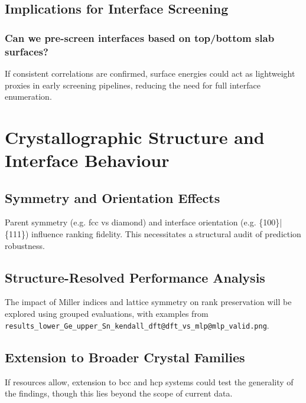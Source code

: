 
\subsection{Implications for Interface Screening}

\subsubsection{Can we pre-screen interfaces based on top/bottom slab surfaces?}

If consistent correlations are confirmed, surface energies could act as lightweight proxies in early screening pipelines, reducing the need for full interface enumeration.

\section{Crystallographic Structure and Interface Behaviour}

\subsection{Symmetry and Orientation Effects}

Parent symmetry (e.g. fcc vs diamond) and interface orientation (e.g. \{100\}|\{111\}) influence ranking fidelity. This necessitates a structural audit of prediction robustness.

\subsection{Structure-Resolved Performance Analysis}

The impact of Miller indices and lattice symmetry on rank preservation will be explored using grouped evaluations, with examples from \texttt{results\_lower\_Ge\_upper\_Sn\_kendall\_dft@dft\_vs\_mlp@mlp\_valid.png}.


\subsection{Extension to Broader Crystal Families}

If resources allow, extension to bcc and hcp systems could test the generality of the findings, though this lies beyond the scope of current data.

